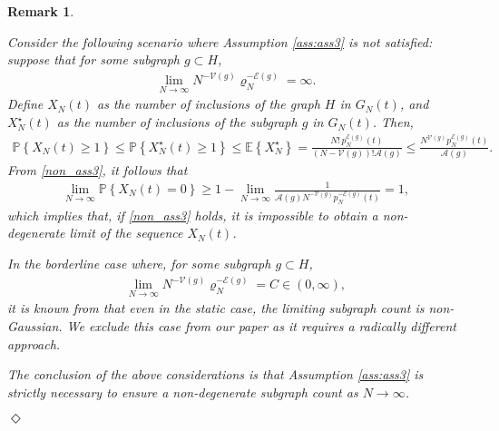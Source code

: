 \documentclass[11pt,reqno]{amsart}
\numberwithin{equation}{section}
\newcommand{\E}[1]{\mathbb{E}\left\{ #1\right\}}
\newcommand{\pk}[1]{\mathbb{P} \left\{ #1 \right \} }
\newtheorem{remark}[theo]{Remark}
\begin{document}
\begin{itemize}
{\begin{remark}\label{ass3_remark}{\em
{Consider the following scenario where Assumption \ref{ass:ass3} is  not satisfied: suppose that for some subgraph $g \subset H$,
\begin{align}
    \lim_{N\to\infty} N^{-\mathcal{V}(g)}\varrho_N^{-\mathcal{E}(g)} = \infty. \label{non_ass3}
\end{align}
Define $X_N(t)$ as the number of inclusions of the graph $H$ in $G_N(t)$, and $X_N^\star(t)$ as the number of inclusions of the subgraph $g$ in $G_N(t)$. Then,
\begin{align*}
    \pk{X_N(t) \geqslant 1} \leqslant \pk{X_N^\star(t) \geqslant 1} \leqslant \E{X_N^\star} = \frac{N! \, p_N^{\mathcal{E}(g)}(t)}{(N-\mathcal{V}(g))! \mathcal{A}(g)} \leqslant \frac{N^{\mathcal{V}(g)} p_N^{\mathcal{E}(g)}(t)}{\mathcal{A}(g)}.
\end{align*}
From \eqref{non_ass3}, it follows that
\begin{align*}
    \lim_{N\to\infty}\pk{X_N(t) = 0} \geqslant 1 - \lim_{N\to\infty} \frac{1}{\mathcal{A}(g) N^{-\mathcal{V}(g)} p_N^{-\mathcal{E}(g)}(t)} = 1,
\end{align*}
which implies that, if \eqref{non_ass3} holds, it is impossible to obtain a non-degenerate limit of the sequence $X_N(t)$.

In the borderline case where, for some subgraph $g \subset H$,
\begin{align*}
    \lim_{N\to\infty} N^{-\mathcal{V}(g)}\varrho_N^{-\mathcal{E}(g)} = C \in (0, \infty),
\end{align*}
it is known from \cite{rucinski1988small} that even in the static case, the limiting subgraph count is non-Gaussian. {We exclude this case from our paper as it requires a radically different approach}.

The conclusion of the above considerations is that Assumption \ref{ass:ass3} is strictly necessary to ensure a non-degenerate subgraph count as $N \to \infty$.
}
\hfill
${\Diamond}$}

    
\end{remark}

}
\end{itemize}
\end{document}
